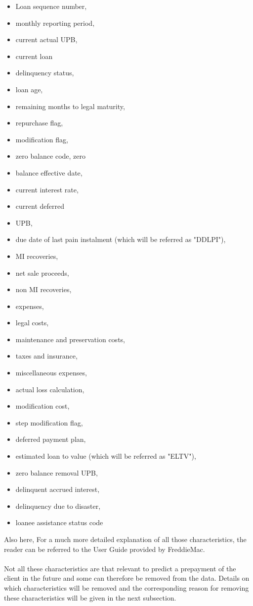     \begin{itemize}
        \item Loan sequence number,
        \item monthly reporting period, 
        \item current actual UPB, 
        \item current loan 
        \item delinquency status, 
        \item loan age, 
        \item remaining months to legal maturity, 
        \item repurchase flag, 
        \item modification flag, 
        \item zero balance code, zero 
        \item balance effective date, 
        \item current interest rate, 
        \item current deferred 
        \item UPB, 
        \item due date of last pain instalment (which will be referred as "DDLPI"), 
        \item MI recoveries, 
        \item net sale  proceeds, 
        \item non MI recoveries, 
        \item expenses, 
        \item legal costs, 
        \item maintenance and preservation costs, 
        \item taxes and insurance, 
        \item miscellaneous expenses, 
        \item actual loss calculation, 
        \item modification cost, 
        \item step modification flag,
        \item deferred payment plan,
        \item estimated loan to value (which will be referred as "ELTV"), 
        \item zero balance removal UPB, 
        \item delinquent accrued interest, 
        \item delinquency due to disaster, 
        \item loanee assistance status code
    \end{itemize}
    Also here, For a much more detailed explanation of all those characteristics,
    the reader can be referred to the User Guide provided by FreddieMac.
    \\\\        
    Not all these characteristics are that relevant to predict a prepayment of the 
    client in the future and some can therefore be removed from the data. 
    Details on which characteristics will be removed and the corresponding 
    reason for removing these characteristics will be given in the next subsection.


